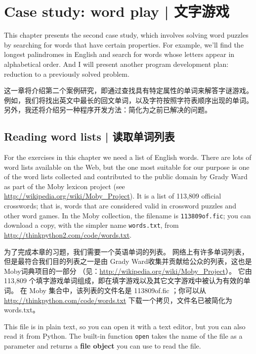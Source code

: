 

\chapter{Case study: word play  |  文字游戏}
\label{wordplay}

This chapter presents the second case study, which involves
solving word puzzles by searching for words that have certain
properties.  For example, we'll find the longest palindromes
in English and search for words whose letters appear in
alphabetical order.  And I will present another program development
plan: reduction to a previously solved problem.

这一章将介绍第二个案例研究，即通过查找具有特定属性的单词来解答字谜游戏。
例如，我们将找出英文中最长的回文单词，以及字符按照字符表顺序出现的单词。
另外，我还将介绍另一种程序开发方法：简化为之前已解决的问题。

\section{Reading word lists  |  读取单词列表}
\label{wordlist}

For the exercises in this chapter we need a list of English words.
There are lots of word lists available on the Web, but the one most
suitable for our purpose is one of the word lists collected and
contributed to the public domain by Grady Ward as part of the Moby
lexicon project (see \url{http://wikipedia.org/wiki/Moby_Project}).  It
is a list of 113,809 official crosswords; that is, words that are
considered valid in crossword puzzles and other word games.  In the
Moby collection, the filename is {\tt 113809of.fic}; you can download
a copy, with the simpler name {\tt words.txt}, from
\url{http://thinkpython2.com/code/words.txt}.
  

为了完成本章的习题，我们需要一个英语单词的列表。
网络上有许多单词列表，但是最符合我们目的列表之一是由 Grady
Ward收集并贡献给公众的列表，这也是Moby词典项目的一部分
（见：\url{http://wikipedia.org/wiki/Moby_Project}）。
它由 113,809 个填字游戏单词组成，即在填字游戏以及其它文字游戏中被认为有效的单词。
在 Moby 集合中，该列表的文件名是 113809of.fic ；你可以从 \url{http://thinkpython.com/code/words.txt} 下载一个拷贝，文件名已被简化为 words.txt。
  

This file is in plain text, so you can open it with a text
editor, but you can also read it from Python.  The built-in
function {\tt open} takes the name of the file as a parameter
and returns a {\bf file object} you can use to read the file.

